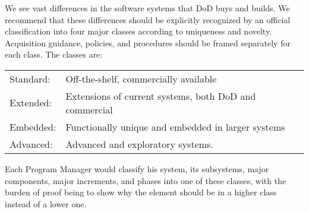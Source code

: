 \documentclass[12pt,final]{article}
\begin{document}
We see vast differences in the software systems that DoD buys and builds. We
recommend that these differences should be explicitly recognized by an official
classification into four major classes according to uniqueness and novelty.
Acquisition guidance, policies, and procedures should be framed separately for
each class. The classes are:

\begin{center}
    \begin{tabular}{ l l }
Standard: & Off-the-shelf, commercially available \\

Extended: & Extensions of current systems, both DoD and commercial \\

Embedded: & Functionally unique and embedded in larger systems \\

Advanced: & Advanced and exploratory systems. \\
    \end{tabular}
\end{center}

Each Program Manager would classify his system, its subsystems, major
components, major increments, and phases into one of these classes, with the
burden of proof being to show why the element should be in a higher class
instead of a lower one.

\end{document}
